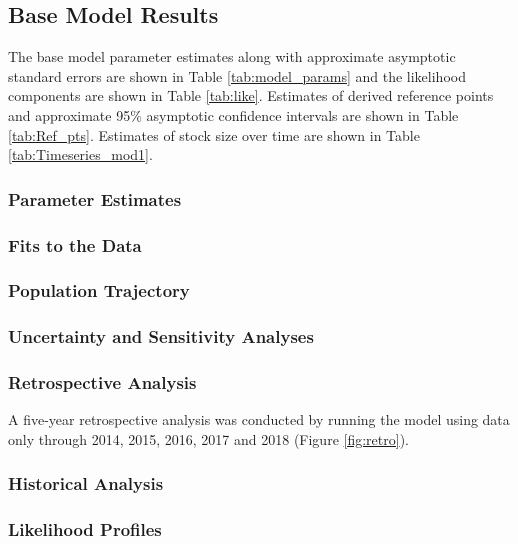 \documentclass[12pt,]{article}
\begin{document}
\subsection{Base Model Results}\label{base-model-results}

The base model parameter estimates along with approximate asymptotic
standard errors are shown in Table \ref{tab:model_params} and the
likelihood components are shown in Table \ref{tab:like}. Estimates of
derived reference points and approximate 95\% asymptotic confidence
intervals are shown in Table \ref{tab:Ref_pts}. Estimates of stock size
over time are shown in Table \ref{tab:Timeseries_mod1}.

\subsubsection{Parameter Estimates}\label{parameter-estimates}

\subsubsection{Fits to the Data}\label{fits-to-the-data}

\subsubsection{Population Trajectory}\label{population-trajectory}

\subsubsection{Uncertainty and Sensitivity
Analyses}\label{uncertainty-and-sensitivity-analyses}

\subsubsection{Retrospective Analysis}\label{retrospective-analysis}

A five-year retrospective analysis was conducted by running the model
using data only through 2014, 2015, 2016, 2017 and 2018 (Figure
\ref{fig:retro}).

\subsubsection{Historical Analysis}\label{historical-analysis}

\subsubsection{Likelihood Profiles}\label{likelihood-profiles}
\end{document}
